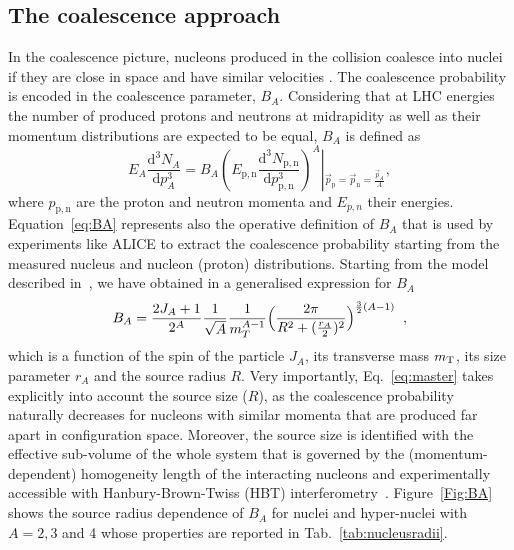 \documentclass{appolb}
\begin{document}
\subsection{The coalescence approach}
In the coalescence picture, nucleons produced in the collision coalesce into nuclei if they are close in space and have similar velocities \cite{Butler:1963, Kapusta:1980, Sato:1981ez, Nagle:1996vp, Scheibl:1998tk}.
The coalescence probability is encoded in the coalescence parameter, $B_{A}$.
Considering that at LHC energies the number of produced protons and neutrons at midrapidity as well as their momentum distributions are expected to be equal, $B_{A}$ is defined as
%
%
\begin{equation}
E_{A}\frac{\mathrm{d}^{3}N_{A}}{\mathrm{d}p_{A}^{3}}=B_{A}{\left(E_{\mathrm{p,n}}\frac{\mathrm{d}^{3}N_{\mathrm{p,n}}}{\mathrm{d}p_{\mathrm{p,n}}^{3}}\right)^{A}}\left\vert_{\vec{p}_{\mathrm{p}}=\vec{p}_{\mathrm{n}}=\frac{\vec{p}_{A}}{A}} \right.,
\label{eq:BA}
\end{equation}
%
%
where $p_{\mathrm{p,n}}$ are the proton and neutron momenta and $E_{p,n}$ their energies. 
Equation~\ref{eq:BA} represents also the operative definition of $B_A$ that is used by experiments like ALICE to extract the coalescence probability starting from the measured nucleus and nucleon (proton) distributions.
Starting from the model described in~\cite{Scheibl:1998tk, Blum:2017qnn}, we have obtained in \cite{Bellini:2018epz} a generalised expression for $B_A$
%
%
\begin{equation}\label{eq:master}
B_{A} = {2J_{A} + 1 \over 2^{A}} {1 \over \sqrt{A}} {1 \over m_{T}^{A-1}} \Bigl({2\pi \over R^2 + ({r_A \over 2})^2 }\Bigr)^{\frac{3}{2}(A-1)} \;\;,
\end{equation}
%
%
\noindent which is a function of the spin of the particle $J_A$, its transverse mass $m_{\rm T}$, its size parameter $r_A$ and the source radius $R$. Very importantly, Eq.~\ref{eq:master} takes explicitly into account the source size ($R$), as the coalescence probability naturally decreases for nucleons with similar momenta that are produced far apart in configuration space. 
Moreover, the source size is identified with the  effective sub-volume of the whole system that is governed by the (momentum-dependent) homogeneity length of the interacting nucleons and experimentally accessible with Hanbury-Brown-Twiss (HBT) interferometry~\cite{Scheibl:1998tk, Blum:2017qnn}. 
Figure~\ref{Fig:BA} shows the source radius dependence of $B_A$ for nuclei and hyper-nuclei with $A = 2, 3$ and 4 whose properties are reported in Tab.~\ref{tab:nucleusradii}. 
\end{document}
